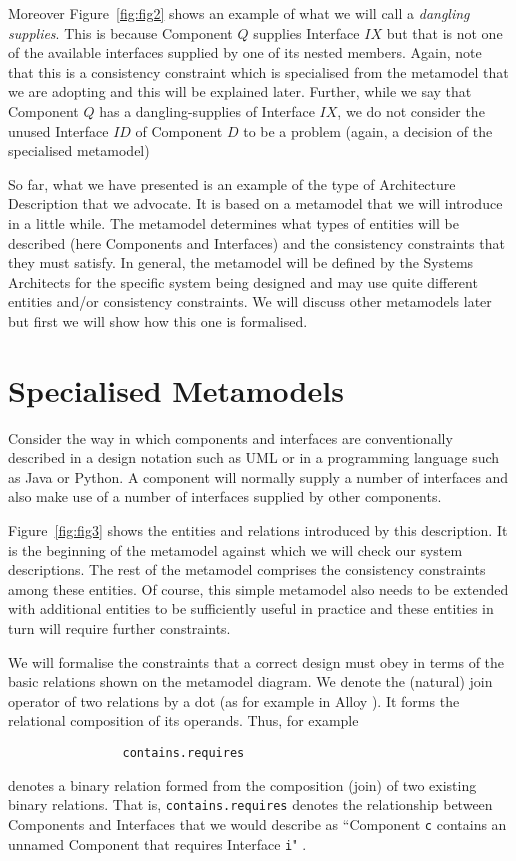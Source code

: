\documentclass{llncs}
\begin{document}
Moreover Figure~\ref{fig:fig2} shows an example of what we will call a {\em dangling supplies}. This is because Component $Q$ supplies Interface $IX$ but that is not one of the available interfaces supplied by one of its nested members. Again, note that this is a consistency constraint which is specialised from the metamodel that we are adopting and this will be explained later. Further, while we say that Component $Q$ has a dangling-supplies of Interface $IX$, we do not consider the unused Interface $ID$ of Component $D$ to be a problem (again, a decision of the specialised metamodel) 

So far, what we have presented is an example of the type of Architecture Description that we advocate. It is based on a metamodel that we will introduce in a little while. The metamodel determines what types of entities will be described (here Components and Interfaces) and the consistency constraints that they must satisfy. In general, the metamodel will be defined by the Systems Architects for the specific system being designed and may use quite different entities and/or consistency constraints. We will discuss other metamodels later but first we will show how this one is formalised.

\section{Specialised Metamodels}
\label{sec:formalisation}
\noindent Consider the way in which components and interfaces are conventionally described in a design notation such as UML or in a programming language such as Java or Python. A component will normally supply a number of interfaces and also make use of a number of interfaces supplied by other components.

Figure~\ref{fig:fig3} shows the entities and relations introduced by this description. It is the beginning of the metamodel against which we will check our system descriptions. The rest of the metamodel comprises the consistency constraints among these entities. Of course, this simple metamodel also needs to be extended with additional entities to be sufficiently useful in practice and these entities in turn will require further constraints. 

We will formalise the constraints that a correct design must obey in terms of the basic relations shown on the metamodel diagram. We denote the (natural) join operator of two relations by a dot (as for example in Alloy \cite{Alloy}). It forms the relational composition of its operands. Thus, for example
\begin{small}
\begin{verbatim}
                contains.requires
\end{verbatim}
\end{small}
denotes a binary relation formed from the composition (join) of two existing binary relations. That is, {\small\verb$contains.requires$} denotes the relationship between Components and Interfaces 
that we would describe as ``Component {\small\verb$c$} 
contains an unnamed Component that requires 
Interface {\small\verb$i$}" . 
\end{document}
